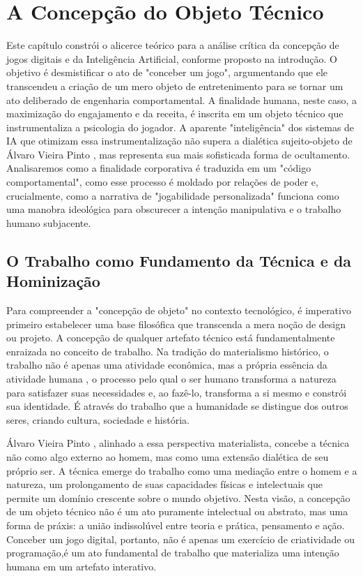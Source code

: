 \chapter{A Concepção do Objeto Técnico}\label{cap:concepcao_obj_tecnico}
 
Este capítulo constrói o alicerce teórico para a análise crítica da concepção de jogos digitais e da Inteligência Artificial, 
conforme proposto na introdução. O objetivo é desmistificar o ato de "conceber um jogo", argumentando que ele transcendeu a criação 
de um mero objeto de entretenimento para se tornar um ato deliberado de engenharia comportamental. A finalidade humana, neste caso, 
a maximização do engajamento e da receita, é inscrita em um objeto técnico que instrumentaliza a psicologia do jogador. A aparente 
"inteligência" dos sistemas de IA que otimizam essa instrumentalização não supera a dialética sujeito-objeto de Álvaro Vieira Pinto \cite{VieiraPinto2005}, 
mas representa sua mais sofisticada forma de ocultamento. Analisaremos como a finalidade corporativa é traduzida em um 
"código comportamental", como esse processo é moldado por relações de poder e, crucialmente, como a narrativa de "jogabilidade 
personalizada" funciona como uma manobra ideológica para obscurecer a intenção manipulativa e o trabalho humano subjacente.

\section{O Trabalho como Fundamento da Técnica e da Hominização}\label{sec:trabalho_como_fundamento}

Para compreender a "concepção de objeto" no contexto tecnológico, é imperativo primeiro estabelecer uma base filosófica que 
transcenda a mera noção de design ou projeto. A concepção de qualquer artefato técnico está fundamentalmente enraizada no conceito 
de trabalho. Na tradição do materialismo histórico, o trabalho não é apenas uma atividade econômica, mas a própria essência da 
atividade humana \cite{Marx2004Manuscritos}, o processo pelo qual o ser humano transforma a natureza para satisfazer suas necessidades e, ao fazê-lo, 
transforma a si mesmo e constrói sua identidade. É através do trabalho que a humanidade se distingue dos outros seres, criando 
cultura, sociedade e história.

Álvaro Vieira Pinto \cite{VieiraPinto2005}, alinhado a essa perspectiva materialista, concebe a técnica não como algo externo ao homem, mas como uma 
extensão dialética de seu próprio ser. A técnica emerge do trabalho como uma mediação entre o homem e a natureza, um prolongamento 
de suas capacidades físicas e intelectuais que permite um domínio crescente sobre o mundo objetivo. Nesta visão, a concepção de um 
objeto técnico não é um ato puramente intelectual ou abstrato, mas uma forma de práxis: a união indissolúvel entre teoria e prática, 
pensamento e ação. Conceber um jogo digital, portanto, não é apenas um exercício de criatividade ou programação,é um ato fundamental 
de trabalho \cite{Marx2004Manuscritos,VieiraPinto2005} que materializa uma intenção humana em um artefato interativo.

